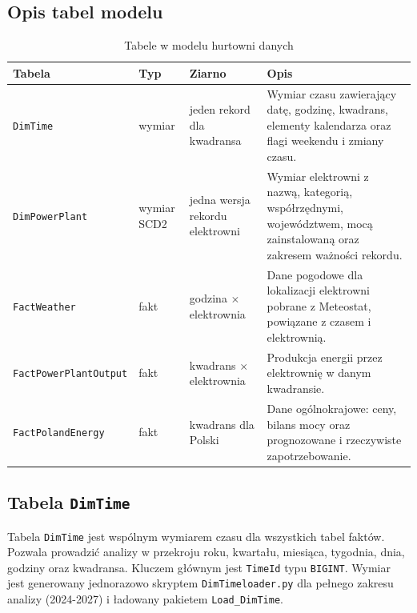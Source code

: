 \documentclass[12pt]{article}
\begin{document}
	\subsection{Opis tabel modelu}

	\begin{table}[h!]
		\centering
		\small
		\begin{tabularx}{\textwidth}{|p{3.8cm}|p{2.0cm}|p{3.4cm}|X|}
			\hline
			\textbf{Tabela} & \textbf{Typ} & \textbf{Ziarno} & \textbf{Opis} \\
			\hline
			\texttt{DimTime} & wymiar & jeden rekord dla kwadransa & Wymiar czasu zawierający datę, godzinę, kwadrans, elementy kalendarza oraz flagi weekendu i zmiany czasu. \\
			\hline
			\texttt{DimPowerPlant} & wymiar SCD2 & jedna wersja rekordu elektrowni & Wymiar elektrowni z nazwą, kategorią, współrzędnymi, województwem, mocą zainstalowaną oraz zakresem ważności rekordu. \\
			\hline
			\texttt{FactWeather} & fakt & godzina $\times$ elektrownia & Dane pogodowe dla lokalizacji elektrowni pobrane z Meteostat, powiązane z czasem i elektrownią. \\
			\hline
			\texttt{FactPowerPlantOutput} & fakt & kwadrans $\times$ elektrownia & Produkcja energii przez elektrownię w danym kwadransie. \\
			\hline
			\texttt{FactPolandEnergy} & fakt & kwadrans dla Polski & Dane ogólnokrajowe: ceny, bilans mocy oraz prognozowane i rzeczywiste zapotrzebowanie. \\
			\hline
		\end{tabularx}
		\caption{Tabele w modelu hurtowni danych}
	\end{table}

	\subsection{Tabela \texttt{DimTime}}

	Tabela \texttt{DimTime} jest wspólnym wymiarem czasu dla wszystkich tabel faktów. Pozwala prowadzić analizy w przekroju roku, kwartału, miesiąca, tygodnia, dnia, godziny oraz kwadransa. Kluczem głównym jest \texttt{TimeId} typu \texttt{BIGINT}. Wymiar jest generowany jednorazowo skryptem \texttt{DimTimeloader.py} dla pełnego zakresu analizy (2024-2027) i ładowany pakietem \texttt{Load\_DimTime}.
\end{document}
